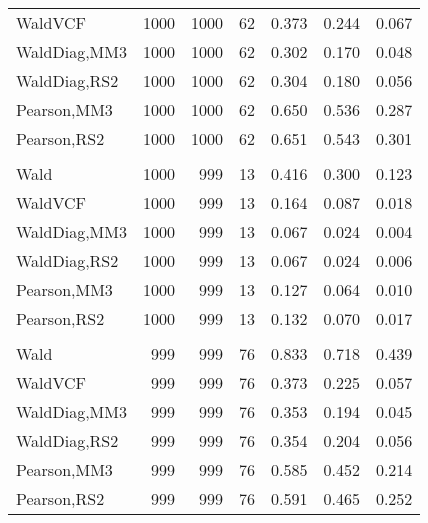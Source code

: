 \documentclass[
]{article}
\begin{document}
\begin{table}[H]
{\begin{tabular}[t]{lrrrrrr}
\hspace{1em}WaldVCF & 1000 & 1000 & 62 & 0.373 & 0.244 & 0.067\\
\hspace{1em}WaldDiag,MM3 & 1000 & 1000 & 62 & 0.302 & 0.170 & 0.048\\
\hspace{1em}WaldDiag,RS2 & 1000 & 1000 & 62 & 0.304 & 0.180 & 0.056\\
\hspace{1em}Pearson,MM3 & 1000 & 1000 & 62 & 0.650 & 0.536 & 0.287\\
\hspace{1em}Pearson,RS2 & 1000 & 1000 & 62 & 0.651 & 0.543 & 0.301\\
\addlinespace[0.3em]
\multicolumn{7}{l}{\textbf{2F 10V}}\\
\hspace{1em}Wald & 1000 & 999 & 13 & 0.416 & 0.300 & 0.123\\
\hspace{1em}WaldVCF & 1000 & 999 & 13 & 0.164 & 0.087 & 0.018\\
\hspace{1em}WaldDiag,MM3 & 1000 & 999 & 13 & 0.067 & 0.024 & 0.004\\
\hspace{1em}WaldDiag,RS2 & 1000 & 999 & 13 & 0.067 & 0.024 & 0.006\\
\hspace{1em}Pearson,MM3 & 1000 & 999 & 13 & 0.127 & 0.064 & 0.010\\
\hspace{1em}Pearson,RS2 & 1000 & 999 & 13 & 0.132 & 0.070 & 0.017\\
\addlinespace[0.3em]
\multicolumn{7}{l}{\textbf{3F 15V}}\\
\hspace{1em}Wald & 999 & 999 & 76 & 0.833 & 0.718 & 0.439\\
\hspace{1em}WaldVCF & 999 & 999 & 76 & 0.373 & 0.225 & 0.057\\
\hspace{1em}WaldDiag,MM3 & 999 & 999 & 76 & 0.353 & 0.194 & 0.045\\
\hspace{1em}WaldDiag,RS2 & 999 & 999 & 76 & 0.354 & 0.204 & 0.056\\
\hspace{1em}Pearson,MM3 & 999 & 999 & 76 & 0.585 & 0.452 & 0.214\\
\hspace{1em}Pearson,RS2 & 999 & 999 & 76 & 0.591 & 0.465 & 0.252\\
\bottomrule
\end{tabular}}
\endgroup{}
\end{table}
\end{document}
